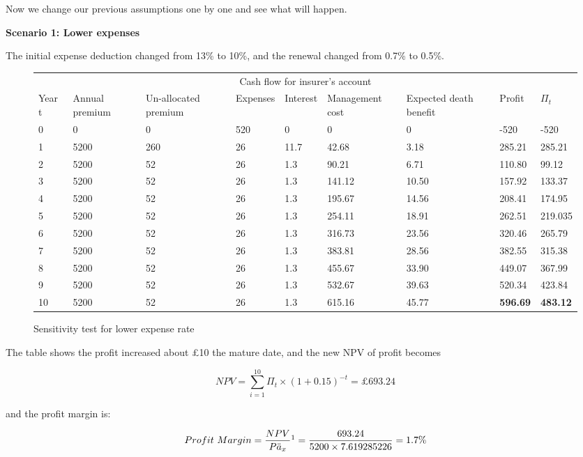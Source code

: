 \documentclass{report}
\begin{document}
Now we change our previous assumptions one by one and see what will happen.

\textbf{Scenario 1: Lower expenses} 

The initial expense deduction changed from 13\% to 10\%, and the renewal changed from 0.7\% to 0.5\%.




\begin{figure}[H]
\hfill
\begin{tabular}{p{0.8cm} p{1.5cm} p{1.5cm} p{1.2cm} p{1cm} p{2cm}p{1.5cm} p{1.5cm} p{1.5cm} }
\toprule
\multicolumn{9}{c}{Cash flow for insurer's account} \\
\cmidrule(r){3-7}

Year t & Annual premium & Un-allocated premium & Expenses & Interest &Management cost& Expected death benefit & Profit& $\Pi_t$  \\
\midrule

0&0&0&520&0&0&0&-520&-520\\
1&5200&260&26&11.7&42.68&3.18&285.21&285.21\\
2&5200&52&26&1.3&90.21&6.71&110.80&99.12\\
3&5200&52&26&1.3&141.12&10.50&157.92&133.37\\
4&5200&52&26&1.3&195.67&14.56&208.41&174.95\\
5&5200&52&26&1.3&254.11&18.91&262.51&219.035\\
6&5200&52&26&1.3&316.73&23.56&320.46&265.79\\
7&5200&52&26&1.3&383.81&28.56&382.55&315.38\\
8&5200&52&26&1.3&455.67&33.90&449.07&367.99\\
9&5200&52&26&1.3&532.67&39.63&520.34&423.84\\
10&5200&52&26&1.3&615.16&45.77&\textbf{596.69}&\textbf{483.12}\\

\bottomrule
\end{tabular}
\caption{Sensitivity test for lower expense rate}
\label{determ-sensi-expense}
\end{figure}

The table shows the profit increased about \pounds 10 the mature date, and the new NPV of profit becomes 

\[
 NPV=\sum_{i=1}^{10} \Pi_t \times (1+0.15)^{-t} = \pounds693.24 
\]
 
and the profit margin is:

\[
Profit\ Margin =  \frac{NPV}{P \ddot{a}_x}\footnote{$\ddot{a}_x$=$\sum_{i=1}^{10} v^t {_tp_x}$=7.619285226, where $_tp_x$ read from table ?!?!?!? and $v=\frac{1}{1+0.05}$}  = \frac{693.24 }{5200 \times 7.619285226} = 1.7\%
\]
\end{document}
